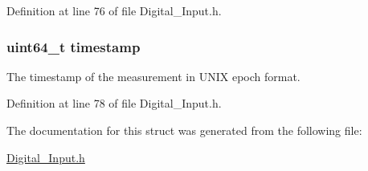 Definition at line 76 of file Digital\-\_\-\-Input.\-h.

\hypertarget{struct_digital___input__t_a465bef81f6478756e5443025b1f2ddfa}{
\subsubsection[{timestamp}]{\setlength{\rightskip}{0pt plus 5cm}uint64\-\_\-t timestamp}}\label{struct_digital___input__t_a465bef81f6478756e5443025b1f2ddfa}
The timestamp of the measurement in U\-N\-I\-X epoch format. 

Definition at line 78 of file Digital\-\_\-\-Input.\-h.



The documentation for this struct was generated from the following file\-:\begin{DoxyCompactItemize}
\item 
\hyperlink{_digital___input_8h}{Digital\-\_\-\-Input.\-h}\end{DoxyCompactItemize}
